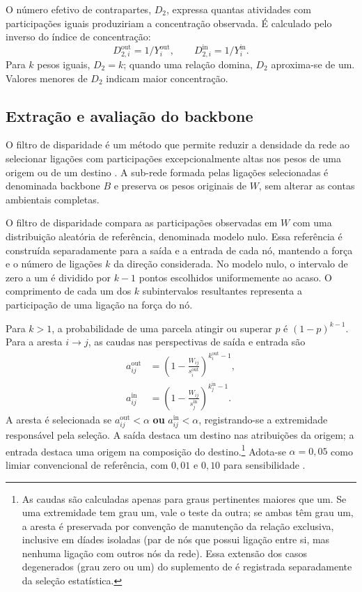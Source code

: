 O número efetivo de contrapartes, $D_2$, expressa quantas atividades com participações iguais produziriam a concentração observada. É calculado pelo inverso do índice de concentração:
\[
D_{2,i}^{\mathrm{out}}=1/Y_i^{\mathrm{out}},\qquad
D_{2,i}^{\mathrm{in}}=1/Y_i^{\mathrm{in}}.
\]
Para $k$ pesos iguais, $D_2=k$; quando uma relação domina, $D_2$ aproxima-se de um. Valores menores de $D_2$ indicam maior concentração. 

\subsection{Extração e avaliação do backbone}
\label{sec:backbone}

O filtro de disparidade é um método que permite reduzir a densidade da rede ao selecionar ligações com participações excepcionalmente altas nos pesos de uma origem ou de um destino \parencite{serrano2009,huang2019}. A sub-rede formada pelas ligações selecionadas é denominada backbone $B$ e preserva os pesos originais de $W$, sem alterar as contas ambientais completas.

O filtro de disparidade compara as participações observadas em $W$ com uma distribuição aleatória de referência, denominada modelo nulo. Essa referência é construída separadamente para a saída e a entrada de cada nó, mantendo a força e o número de ligações $k$ da direção considerada. No modelo nulo, o intervalo de zero a um é dividido por $k-1$ pontos escolhidos uniformemente ao acaso. O comprimento de cada um dos $k$ subintervalos resultantes representa a participação de uma ligação na força do nó.

Para $k>1$, a probabilidade de uma parcela atingir ou superar $p$ é $(1-p)^{k-1}$. Para a aresta $i\rightarrow j$, as caudas nas perspectivas de saída e entrada são
\begin{equation}
\begin{aligned}
a_{ij}^{\mathrm{out}}&=\left(1-\frac{W_{ij}}{s_i^{\mathrm{out}}}\right)^{k_i^{\mathrm{out}}-1},\\
a_{ij}^{\mathrm{in}}&=\left(1-\frac{W_{ij}}{s_j^{\mathrm{in}}}\right)^{k_j^{\mathrm{in}}-1}.
\end{aligned}
\label{eq:caudas-filtro}
\end{equation}
A aresta é selecionada se $a_{ij}^{\mathrm{out}}<\alpha$ \textbf{ou} $a_{ij}^{\mathrm{in}}<\alpha$, registrando-se a extremidade responsável pela seleção. A saída destaca um destino nas atribuições da origem; a entrada destaca uma origem na composição do destino.\footnote{As caudas são calculadas apenas para graus pertinentes maiores que um. Se uma extremidade tem grau um, vale o teste da outra; se ambas têm grau um, a aresta é preservada por convenção de manutenção da relação exclusiva, inclusive em díades isoladas (par de nós que possui ligação entre si, mas nenhuma ligação com outros nós da rede). Essa extensão dos casos degenerados (grau zero ou um) do suplemento de \textcite{serrano2009} é registrada separadamente da seleção estatística.} Adota-se $\alpha=0{,}05$ como limiar convencional de referência, com $0{,}01$ e $0{,}10$ para sensibilidade \parencite{serrano2009}. 

